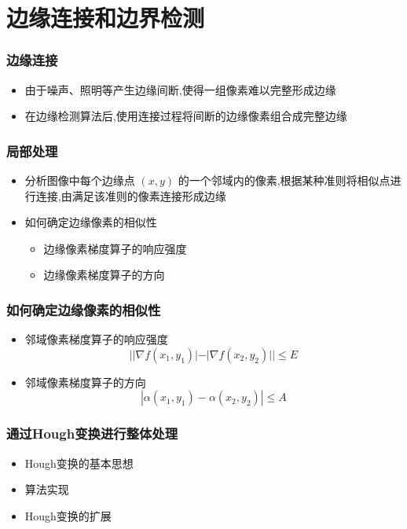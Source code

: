 \documentclass{beamer}
\begin{document}
\section{边缘连接和边界检测}
\label{sec-3}
\begin{frame}
\frametitle{边缘连接}
\label{sec-3-1}

\begin{itemize}
\item 由于噪声、照明等产生边缘间断,使得一组像素难以完整形成边缘
\item 在边缘检测算法后,使用连接过程将间断的边缘像素组合成完整边缘
\end{itemize}
\end{frame}
\begin{frame}
\frametitle{局部处理}
\label{sec-3-2}

\begin{itemize}
\item 分析图像中每个边缘点 $(x,y)$ 的一个邻域内的像素,根据某种准则将相似点进行连接,由满足该准则的像素连接形成边缘
\item 如何确定边缘像素的相似性
\begin{itemize}
\item 边缘像素梯度算子的响应强度
\item 边缘像素梯度算子的方向
\end{itemize}
\end{itemize}
\end{frame}
\begin{frame}
\frametitle{如何确定边缘像素的相似性}
\label{sec-3-3}

\begin{itemize}
\item 邻域像素梯度算子的响应强度
     \[ ||\nabla f(x_1,y_1)|-|\nabla f(x_2,y_2)||\leq E \]
\item 邻域像素梯度算子的方向
     \[ |\alpha(x_1,y_1)-\alpha(x_2,y_2)|\leq A  \]
\end{itemize}
\end{frame}
\begin{frame}
\frametitle{通过Hough变换进行整体处理}
\label{sec-3-4}

\begin{itemize}
\item Hough变换的基本思想
\item 算法实现
\item Hough变换的扩展
\end{itemize}
\end{frame}
\end{document}
